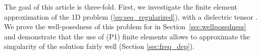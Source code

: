 {%


The goal of this article is three-fold. 
First, we investigate the finite element approximation of the 1D 
problem (\ref{eq:seq_regularized}), with a dielectric tensor . 
We prove the well-posedness of this problem for  in Section~\ref{sec:wellposedness} and 
demonstrate that the use of  (P1) finite elements allows to approximate the singularity 
of the solution fairly well (Section \ref{sec:freq_dep}). 
}

